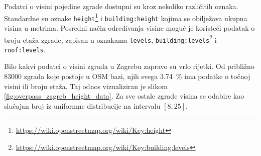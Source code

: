 \documentclass[times, utf8, zavrsni, numeric]{fer}
\begin{document}
		Podatci o visini pojedine zgrade dostupni su kroz nekoliko različitih oznaka.
		Standardne su oznake \texttt{height}\footnote{\url{https://wiki.openstreetmap.org/wiki/Key:height}} i \texttt{building:height} kojima se obilježava ukupna visina u metrima.
		Posredni način određivanja visine moguć je koristeći podatak o broju etaža zgrade, zapisan u oznakama \texttt{levels}, \texttt{building:levels}\footnote{\url{https://wiki.openstreetmap.org/wiki/Key:building:levels}} i \texttt{roof:levels}.
		
		Bilo kakvi podatci o visini zgrada u Zagrebu zapravo su vrlo rijetki.
		Od približno \SI{83 000}{} zgrada koje postoje u OSM bazi, njih svega \SI{3.74}{\percent} ima podatke o točnoj visini ili broju etaža.
		Taj odnos vizualiziran je slikom \ref{fig:overpass_zagreb_height_data}.
		Za sve ostale zgrade visina se odabire kao slučajan broj iz uniformne distribucije na intervalu $\left[8, 25\right]$.
		
\end{document}
